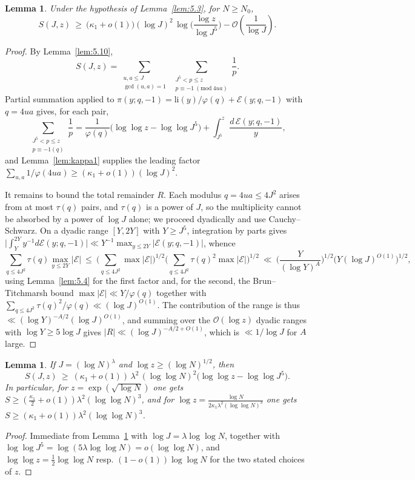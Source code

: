 \documentclass[11pt, a4paper]{article}
\theoremstyle{plain}
\newtheorem{lemma}[theorem]{Lemma}
\theoremstyle{definition}
\begin{document}
\begin{lemma} \label{lem:5.5}
Under the hypothesis of Lemma~\ref{lem:5.3}, for $N\ge N_0$,
\begin{equation} \label{eq:5.5.1}
S(J,z) \ \ge\ \big(\kappa_1+o(1)\big)(\log J)^{2}\,\log\!\Big(\frac{\log z}{\log J^{5}}\Big) - \mathcal{O}\!\left(\frac{1}{\log J}\right).
\end{equation}
\end{lemma}
\begin{proof}
By Lemma~\ref{lem:5.10},
$$S(J,z)=\sum_{\substack{u,a\le J\\ \gcd(u,a)=1}}\ \sum_{\substack{J^{5}<p\le z\\ p\equiv-1\ (\mathrm{mod}\ 4ua)}}\frac1p .$$
Partial summation applied to $\pi(y;q,-1)=\mathrm{li}(y)/\varphi(q)+\mathcal{E}(y;q,-1)$ with $q=4ua$ gives, for each pair,
$$\sum_{\substack{J^5 < p \le z \\ p \equiv -1 (q)}} \frac{1}{p}=\frac{1}{\varphi(q)}\Big(\log\log z - \log\log J^5\Big)+\int_{J^5}^z\frac{d\,\mathcal{E}(y; q, -1)}{y},$$
and Lemma~\ref{lem:kappa1} supplies the leading factor $\sum_{u,a}1/\varphi(4ua)\ge(\kappa_1+o(1))(\log J)^{2}$.

It remains to bound the total remainder $R$. Each modulus $q=4ua\le4J^{2}$ arises from at most $\tau(q)$ pairs, and $\tau(q)$ is a power of $J$, so the multiplicity cannot be absorbed by a power of $\log J$ alone; we proceed dyadically and use Cauchy--Schwarz. On a dyadic range $[Y,2Y]$ with $Y\ge J^{5}$, integration by parts gives $\big|\int_Y^{2Y}y^{-1}d\mathcal{E}(y;q,-1)\big|\ll Y^{-1}\max_{y\le2Y}|\mathcal{E}(y;q,-1)|$, whence
$$\sum_{q\le4J^{2}}\tau(q)\max_{y\le 2Y}|\mathcal{E}| \ \le\ \Big(\sum_{q\le4J^{2}}\max|\mathcal{E}|\Big)^{1/2}\Big(\sum_{q\le4J^{2}}\tau(q)^{2}\max|\mathcal{E}|\Big)^{1/2}
\ \ll\ \Big(\frac{Y}{(\log Y)^{A}}\Big)^{1/2}\big(Y(\log J)^{O(1)}\big)^{1/2},$$
using Lemma~\ref{lem:5.4} for the first factor and, for the second, the Brun--Titchmarsh bound $\max|\mathcal{E}|\ll Y/\varphi(q)$ together with $\sum_{q\le4J^{2}}\tau(q)^{2}/\varphi(q)\ll(\log J)^{O(1)}$. The contribution of the range is thus $\ll(\log Y)^{-A/2}(\log J)^{O(1)}$, and summing over the $\mathcal{O}(\log z)$ dyadic ranges with $\log Y\ge5\log J$ gives $|R|\ll(\log J)^{-A/2+O(1)}$, which is $\ll1/\log J$ for $A$ large.
\end{proof}

\begin{lemma} \label{lem:5.6}
If $J=(\log N)^{\lambda}$ and $\log z\ge(\log N)^{1/2}$, then
$$S(J,z)\ \ge\ (\kappa_1+o(1))\,\lambda^{2}\,(\log\log N)^{2}\big(\log\log z-\log\log J^{5}\big).$$
In particular, for $z=\exp(\sqrt{\log N})$ one gets $S\ge(\tfrac{\kappa_1}{2}+o(1))\lambda^{2}(\log\log N)^{3}$, and for $\log z=\frac{\log N}{2\kappa_1\lambda^{2}(\log\log N)^{3}}$ one gets $S\ge(\kappa_1+o(1))\lambda^{2}(\log\log N)^{3}$.
\end{lemma}
\begin{proof}
Immediate from Lemma~\ref{lem:5.5} with $\log J=\lambda\log\log N$, together with $\log\log J^{5}=\log(5\lambda\log\log N)=o(\log\log N)$, and $\log\log z=\frac12\log\log N$ resp. $(1-o(1))\log\log N$ for the two stated choices of $z$.
\end{proof}
\end{document}
